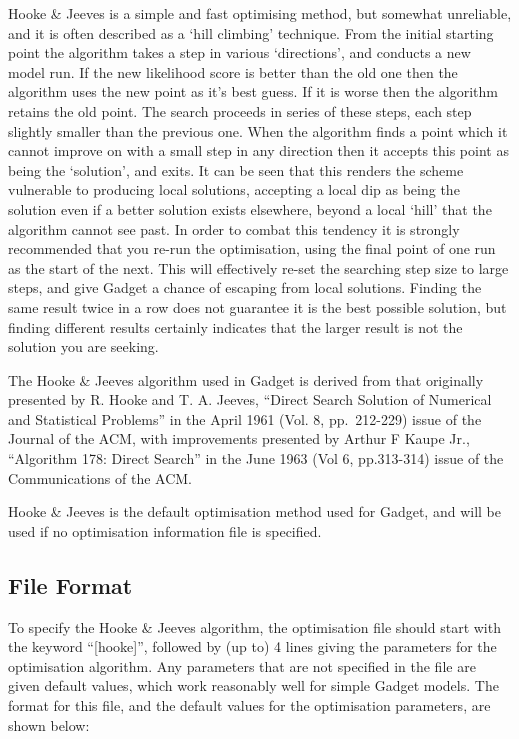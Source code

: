 \documentclass[]{book}
\begin{document}
Hooke \& Jeeves is a simple and fast optimising method, but somewhat
unreliable, and it is often described as a `hill climbing' technique.
From the initial starting point the algorithm takes a step in various
`directions', and conducts a new model run. If the new likelihood score
is better than the old one then the algorithm uses the new point as it's
best guess. If it is worse then the algorithm retains the old point. The
search proceeds in series of these steps, each step slightly smaller
than the previous one. When the algorithm finds a point which it cannot
improve on with a small step in any direction then it accepts this point
as being the `solution', and exits. It can be seen that this renders the
scheme vulnerable to producing local solutions, accepting a local dip as
being the solution even if a better solution exists elsewhere, beyond a
local `hill' that the algorithm cannot see past. In order to combat this
tendency it is strongly recommended that you re-run the optimisation,
using the final point of one run as the start of the next. This will
effectively re-set the searching step size to large steps, and give
Gadget a chance of escaping from local solutions. Finding the same
result twice in a row does not guarantee it is the best possible
solution, but finding different results certainly indicates that the
larger result is not the solution you are seeking.

The Hooke \& Jeeves algorithm used in Gadget is derived from that
originally presented by R. Hooke and T. A. Jeeves, ``Direct Search
Solution of Numerical and Statistical Problems'' in the April 1961 (Vol.
8, pp.~212-229) issue of the Journal of the ACM, with improvements
presented by Arthur F Kaupe Jr., ``Algorithm 178: Direct Search'' in the
June 1963 (Vol 6, pp.313-314) issue of the Communications of the ACM.

Hooke \& Jeeves is the default optimisation method used for Gadget, and
will be used if no optimisation information file is specified.

\hypertarget{subsec:hookefile}{%
\subsection{File Format}\label{subsec:hookefile}}

To specify the Hooke \& Jeeves algorithm, the optimisation file should
start with the keyword ``{[}hooke{]}'', followed by (up to) 4 lines giving
the parameters for the optimisation algorithm. Any parameters that are
not specified in the file are given default values, which work
reasonably well for simple Gadget models. The format for this file, and
the default values for the optimisation parameters, are shown below:
\end{document}
